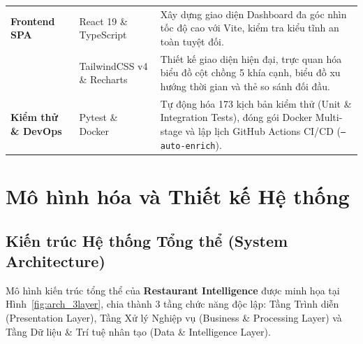 \documentclass[12pt, a4paper]{article}
\begin{document}
\begin{table}[H]
\begin{tabularx}{\textwidth}{l l X}
\midrule
\textbf{Frontend SPA} & React 19 \& TypeScript & Xây dựng giao diện Dashboard đa góc nhìn tốc độ cao với Vite, kiểm tra kiểu tĩnh an toàn tuyệt đối. \\
\addlinespace
 & TailwindCSS v4 \& Recharts & Thiết kế giao diện hiện đại, trực quan hóa biểu đồ cột chồng 5 khía cạnh, biểu đồ xu hướng thời gian và thẻ so sánh đối đầu. \\
\midrule
\textbf{Kiểm thử \& DevOps} & Pytest \& Docker & Tự động hóa 173 kịch bản kiểm thử (Unit \& Integration Tests), đóng gói Docker Multi-stage và lập lịch GitHub Actions CI/CD (\texttt{--auto-enrich}). \\
\bottomrule
\end{tabularx}
\end{table}

\newpage
\section{Mô hình hóa và Thiết kế Hệ thống}

\subsection{Kiến trúc Hệ thống Tổng thể (System Architecture)}
Mô hình kiến trúc tổng thể của \textbf{Restaurant Intelligence} được minh họa tại Hình~\ref{fig:arch_3layer}, chia thành 3 tầng chức năng độc lập: Tầng Trình diễn (Presentation Layer), Tầng Xử lý Nghiệp vụ (Business \& Processing Layer) và Tầng Dữ liệu \& Trí tuệ nhân tạo (Data \& Intelligence Layer).
\end{document}
